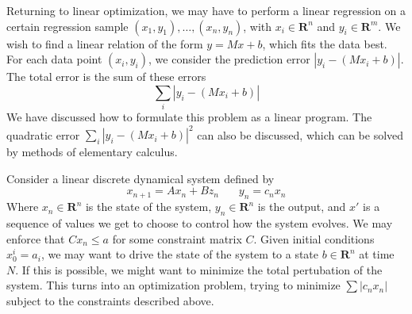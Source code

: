     \begin{example}
        Returning to linear optimization, we may have to perform a linear regression on a certain regression sample $(x_1, y_1), \dots, (x_n, y_n)$, with $x_i \in \mathbf{R}^n$ and $y_i \in \mathbf{R}^m$. We wish to find a linear relation of the form $y = Mx + b$, which fits the data best. For each data point $(x_i, y_i)$, we consider the prediction error $|y_i - (Mx_i + b)|$. The total error is the sum of these errors
        \[ \sum_i |y_i - (Mx_i + b)| \]
        We have discussed how to formulate this problem as a linear program. The quadratic error $\sum_i |y_i - (Mx_i + b)|^2$ can also be discussed, which can be solved by methods of elementary calculus.
    \end{example}

    \begin{example}
        Consider a linear discrete dynamical system defined by
        \[ x_{n+1} = Ax_n + Bz_n\ \ \ \ \ \ \ \ y_n = c_nx_n \]
        Where $x_n \in \mathbf{R}^n$ is the state of the system, $y_n \in \mathbf{R}^n$ is the output, and $x'$ is a sequence of values we get to choose to control how the system evolves. We may enforce that $C x_n \leq a$ for some constraint matrix $C$. Given initial conditions $x_0^i = a_i$, we may want to drive the state of the system to a state $b \in \mathbf{R}^n$ at time $N$. If this is possible, we might want to minimize the total pertubation of the system. This turns into an optimization problem, trying to minimize $\sum |c_nx_n|$ subject to the constraints described above.
    \end{example}





